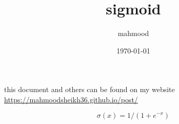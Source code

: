 \documentclass[a4paper,12pt]{article}
\author{mahmood}
\date{\today}
\title{sigmoid}
\begin{document}
\maketitle
\begin{note}
this document and others can be found on my website\\
\url{https://mahmoodsheikh36.github.io/post/}
\end{note}
\[
\sigma(x) = 1/(1+e^{-x})
\]
\end{document}
